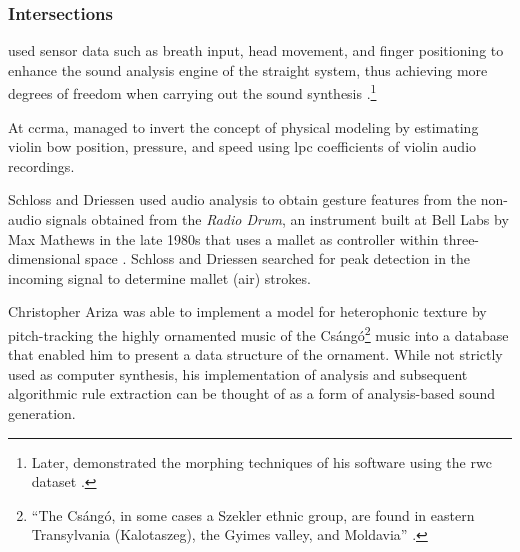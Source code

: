 \subsubsection{Intersections}
{
	\citeauthor{icmc/bbp2372.1999.411} used sensor data such as breath input, head movement, and finger positioning to enhance the sound analysis engine of the \gls{straight} system, thus achieving more degrees of freedom when carrying out the sound synthesis \parencite{icmc/bbp2372.1999.411}.\footnote{Later, \citeauthor{Kawahara:2004} demonstrated the morphing techniques of his software using the \gls{rwc} dataset \parencite{Kawahara:2004}.} 


	At \gls{ccrma}, \citeauthor{icmc/bbp2372.2001.071} \parencite{icmc/bbp2372.2001.071} managed to invert the concept of physical modeling by estimating violin bow position, pressure, and speed using \gls{lpc} coefficients of violin audio recordings. 


	Schloss and Driessen \parencite{icmc/bbp2372.2001.103} used audio analysis to obtain gesture features from the non-audio signals obtained from the \textit{Radio Drum}, an instrument built at Bell Labs by Max Mathews in the late 1980s that uses a mallet as controller within three-dimensional space \parencite{DBLP:conf/icmc/Boie89}. Schloss and Driessen searched for peak detection in the incoming signal to determine mallet (air) strokes. 


	Christopher Ariza \parencite{icmc/bbp2372.2003.030} was able to implement a model for heterophonic texture by pitch-tracking the highly ornamented music of the Csángó\footnote{``The Csángó, in some cases a Szekler ethnic group, are found in eastern Transylvania (Kalotaszeg), the Gyimes valley, and Moldavia'' \parencite{icmc/bbp2372.2003.030}.} music into a database that enabled him to present a data structure of the ornament. While not strictly used as computer synthesis, his implementation of analysis and subsequent algorithmic rule extraction can be thought of as a form of analysis-based sound generation.
}

